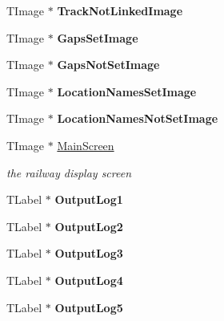 \begin{DoxyCompactItemize}
T\+Image $\ast$ {\bfseries Track\+Not\+Linked\+Image}
\item 
\mbox{\label{class_t_interface_ac8fe7340879483fb2d01c256b944cfe3}} 
T\+Image $\ast$ {\bfseries Gaps\+Set\+Image}
\item 
\mbox{\label{class_t_interface_a3a2fab162e83f83720f240764dc92333}} 
T\+Image $\ast$ {\bfseries Gaps\+Not\+Set\+Image}
\item 
\mbox{\label{class_t_interface_a34a433c061f54ec17338ac77fd374426}} 
T\+Image $\ast$ {\bfseries Location\+Names\+Set\+Image}
\item 
\mbox{\label{class_t_interface_aa46ab1c5f1a9ba7f2c23a5d6df8acbfc}} 
T\+Image $\ast$ {\bfseries Location\+Names\+Not\+Set\+Image}
\item 
\mbox{\label{class_t_interface_a24ed70b178edf21a515d34df17b6aeb3}} 
T\+Image $\ast$ \mbox{\hyperlink{class_t_interface_a24ed70b178edf21a515d34df17b6aeb3}{Main\+Screen}}
\begin{DoxyCompactList}\small\item\em the railway display screen \end{DoxyCompactList}\item 
\mbox{\label{class_t_interface_a38215bb67fd2be9e37e5fa2046a1ce4a}} 
T\+Label $\ast$ {\bfseries Output\+Log1}
\item 
\mbox{\label{class_t_interface_a1116a711940ce359a25b5b0fea3b24eb}} 
T\+Label $\ast$ {\bfseries Output\+Log2}
\item 
\mbox{\label{class_t_interface_ad6642b68342d8dfbf6cc1e54873f810c}} 
T\+Label $\ast$ {\bfseries Output\+Log3}
\item 
\mbox{\label{class_t_interface_aed0b3423cf12322d5d8ada97d3bd20c4}} 
T\+Label $\ast$ {\bfseries Output\+Log4}
\item 
\mbox{\label{class_t_interface_a5c808ca5761a661901f10901071ffde0}} 
T\+Label $\ast$ {\bfseries Output\+Log5}
\item 

\end{DoxyCompactItemize}
